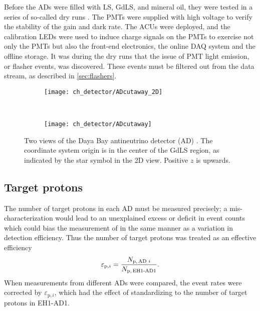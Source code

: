 Before the ADs were filled with LS, GdLS, and mineral oil,
they were tested in a series of so-called dry runs \cite{dryrun1}.
The PMTs were supplied with high voltage
to verify the stability of the gain and dark rate.
The ACUs were deployed, and the calibration LEDs
were used to induce charge signals on the PMTs
to exercise not only the PMTs but also the front-end electronics,
the online DAQ system and the offline storage.
It was during the dry runs that the issue of PMT light emission,
or flasher events, was discovered.
These events must be filtered out from the data stream,
as described in \cref{sec:flashers}.

\begin{figure}
    \centering
    \begin{subfigure}{\textwidth}
        \centering
        \texttt{[image: ch\_detector/ADcutaway\_2D]}
    \end{subfigure}
    \vspace{1cm}\\
    \begin{subfigure}[0.4\textheight]{\textwidth}
        \centering
        \texttt{[image: ch\_detector/ADcutaway]}
    \end{subfigure}
    \caption[Layout of a Daya Bay AD]{
        Two views of the Daya Bay antineutrino detector (AD)
        \cite{ngd2016,internal_files}.
        The coordinate system origin is in the center of the GdLS region,
        as indicated by the star symbol in the 2D view.
        Positive $z$ is upwards.
    }
    \label{fig:ad_cutaway}
\end{figure}

\subsection{Target protons}
\label{subsec:target_mass}

The number of target protons in each AD must be measured precisely;
a mis-characterization would lead to an unexplained excess or deficit
in event counts which could bias the measurement of \thetaot{}
in the same manner as a variation in detection efficiency.
Thus the number of target protons was treated as an effective efficiency
\begin{equation}\label{eq:target_protons_eff}
    \varepsilon_{\text{p},i} = \frac{N_{\text{p,\,AD }i}}{N_\text{p,\,EH1-AD1}}.
\end{equation}
When measurements from different ADs were compared,
the event rates were corrected by $\varepsilon_{\text{p},i}$,
which had the effect of standardizing to the number of target protons in EH1-AD1.

